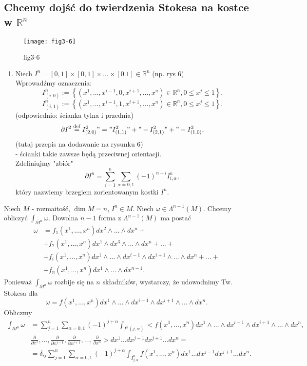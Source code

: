 \documentclass[../main.tex]{subfiles}
\begin{document}
    \subsection{Chcemy dojść do twierdzenia Stokesa na kostce w $\mathbb{R}^n$}
    \begin{figure}[h]
        \centering
        \texttt{[image: fig3-6]}
        \caption{fig3-6}
        \label{fig:fig3-6}
    \end{figure}
    \begin{enumerate}
        \item Niech $I^n = [0,1]\times[0,1]\times\ldots\times[0.1]\in \mathbb{R}^n$ (np. rys 6)\\
Wprowadźmy oznaczenia:
\[
    I^n_{(i,0)} := \left\{ \left( x^1,\ldots,x^{i-1},0,x^{i+1},\ldots,x^n \right) \in \mathbb{R}^n, 0\le x^j\le 1 \right\}
.\]
\[
    I^n_{(i,1)} := \left\{ \left( x^1,\ldots,x^{i-1},1,x^{i+1},\ldots,x^n \right) \in \mathbb{R}^n, 0\le x^j\le 1 \right\}
.\]
(odpowiednio: ścianka tylna i przednia)
\[
    \partial I^2 \overset{\text{def}}{=} I^2_{(2,0)} "=" I^2_{(1,1)} "+" - I^2_{(2,1)} "+" - I^2_{(1,0)}
,\]
(tutaj przepis na dodawanie na rysunku 6)\\
- ścianki takie zawsze będą przeciwnej orientacji.\\
Zdefiniujmy "zbiór"
\[
    \partial I^n = \sum_{i = 1}^n \sum_{\alpha = 0,1} (-1)^{\alpha + i}I^n_{i,\alpha}
,\]
który nazwiemy brzegiem zorientowanym kostki $I^n$.
    \end{enumerate}
        Niech $M$ - rozmaitość, $\dim M = n$, $I^n \in M$. Niech $\omega\in \Lambda^{n-1}(M)$. Chcemy obliczyć $\int_{\partial I^n}\omega$. Dowolna $n-1$ forma z $\Lambda^{n-1}(M)$ ma postać
        \begin{align*}
            \omega &= f_1(x^1,\ldots,x^n)dx^2\land\ldots\land dx^n +\\
            &+f_2(x^1,\ldots,x^n)dx^1\land dx^3\land\ldots\land dx^n + \ldots +\\
            &+ f_i(x^1,\ldots,x^n)dx^1\land\ldots\land dx^{i-1}\land dx^{i+1}\land \ldots\land dx^n + \ldots +\\
            &+ f_n(x^1,\ldots,x^n)dx^1\land\ldots\land dx^{n-1}
        .\end{align*}
        Ponieważ $\int_{\partial I^n}\omega$ rozbije się na $n$ składników, wystarczy, że udowodnimy Tw. Stokesa dla
        \[
            \omega = f(x^1,\ldots,x^n)dx^1\land \ldots\land dx^{i-1}\land dx^{i+1}\land \ldots \land dx^n
        .\]
    Obliczmy
    \begin{align*}
        \int_{\partial I^n}\omega &= \sum_{j=1}^n\sum_{\alpha = 0,1}(-1)^{j+\alpha} \int_{I^n(j,\alpha)}\Bigg<f(x^1,\ldots,x^n)dx^1\land\ldots\land dx^{i-1}\land dx^{i+1}\land \ldots\land dx^n,\\
        &\frac{\partial }{\partial x^1} ,\ldots, \frac{\partial }{\partial x^{j-1}}, \frac{\partial }{\partial x^{j+1}}, \ldots, \frac{\partial }{\partial x^n}\Bigg>
        dx^1\ldots dx^{j-1}dx^{j+1}\ldots dx^n = \\
        &= \delta_{ij}\sum_{j=1}^n \sum_{\alpha = 0,1}(-1)^{j+\alpha}\int_{I^n_{j,\alpha}}f(x^1,\ldots,x^n)dx^1\ldots dx^{j-1}dx^{j+1}\ldots dx^n
    .\end{align*}
\end{document}
